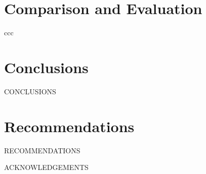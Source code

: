 \documentclass[12pt]{article}
\begin{document}
\section{Comparison and Evaluation}
ccc


\section{Conclusions}
CONCLUSIONS


\section{Recommendations}
RECOMMENDATIONS


\newpage



\newpage


ACKNOWLEDGEMENTS
\newpage


\end{document}
